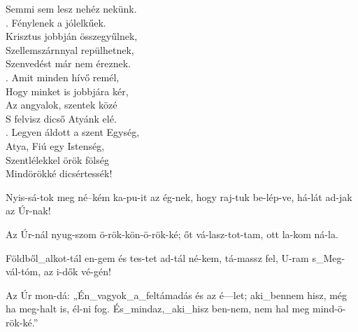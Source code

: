 \documentclass[twoside]{article}
\begin{document}
\begin{hymnstanzas}
  Semmi sem lesz nehéz nekünk.\\
. Fénylenek a jólelkűek.\\
  Krisztus jobbján összegyűlnek,\\
  Szellemszárnnyal repülhetnek,\\
  Szenvedést már nem éreznek.\\
. Amit minden hívő remél,\\
  Hogy minket is jobbjára kér,\\
  Az angyalok, szentek közé\\
  S felvisz dicső Atyánk elé.\\
. Legyen áldott a szent Egység,\\
  Atya, Fiú egy Istenség,\\
  Szentlélekkel örök fölség\\
  Mindörökké dicsértessék!
\end{hymnstanzas}

\begin{gregosheet}
            {   Nyis-sá-tok meg né--kém ka-pu-it az ég-nek, hogy raj-tuk be-lép-ve, há-lát ad-jak az Úr-nak!}
\end{gregosheet}

\begin{gregosheet}
            {   Az Úr-nál nyug-szom ö-rök-kön-ö-rök-ké; őt vá-lasz-tot-tam, ott la-kom ná-la.}
\end{gregosheet}

\begin{gregosheet}
            {   Földből_alkot-tál en-gem  és tes-tet ad-tál né-kem, tá-massz fel, U-ram s_Meg-vál-tóm, az i-dők vé-gén!}
\end{gregosheet}

\begin{gregosheet}
            {   Az Úr mon-dá: „Én_vagyok_a_feltámadás és az é---let; aki_bennem hisz, még ha meg-halt is, él-ni fog. És_mindaz,_aki_hisz ben-nem, nem hal meg mind-ö-rök-ké.”}
\end{gregosheet}
\end{document}
